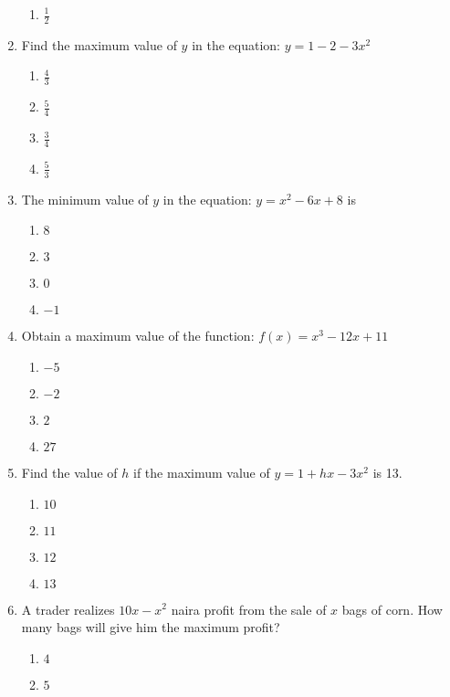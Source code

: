 \begin{enumerate}[label={\arabic*.}]
\begin{enumerate}[label={\Alph*.}]
            \item \(\frac{1}{2}\)
        \end{enumerate}
  \item Find the maximum value of \(y\) in the equation: \(y = 1 - 2 - 3x^2\)
        \begin{enumerate}[label={\Alph*.}]
            \item \(\frac{4}{3}\)
            \item \(\frac{5}{4}\)
            \item \(\frac{3}{4}\)
            \item \(\frac{5}{3}\)
        \end{enumerate}
  \item The minimum value of \(y\) in the equation: \(y = x^2 - 6x + 8\) is
        \begin{enumerate}[label={\Alph*.}]
            \item \(8\)
            \item \(3\)
            \item \(0\)
            \item \(-1\)
        \end{enumerate}
  \item Obtain a maximum value of the function: \(f(x) = x^3 - 12x + 11\)
        \begin{enumerate}[label={\Alph*.}]
            \item \(-5\)
            \item \(-2\)
            \item \(2\)
            \item \(27\)
        \end{enumerate}
  \item Find the value of \(h\) if the maximum value of \(y = 1 + hx - 3x^2\) is 13.
        \begin{enumerate}[label={\Alph*.}]
            \item \(10\)
            \item \(11\)
            \item \(12\)
            \item \(13\)
        \end{enumerate}
  \item A trader realizes \(10x - x^2\) naira profit from the sale of \(x\) bags of corn. How many bags will give him the maximum profit?
        \begin{enumerate}[label={\Alph*.}]
            \item \(4\)
            \item \(5\)

\end{enumerate}
\end{enumerate}
